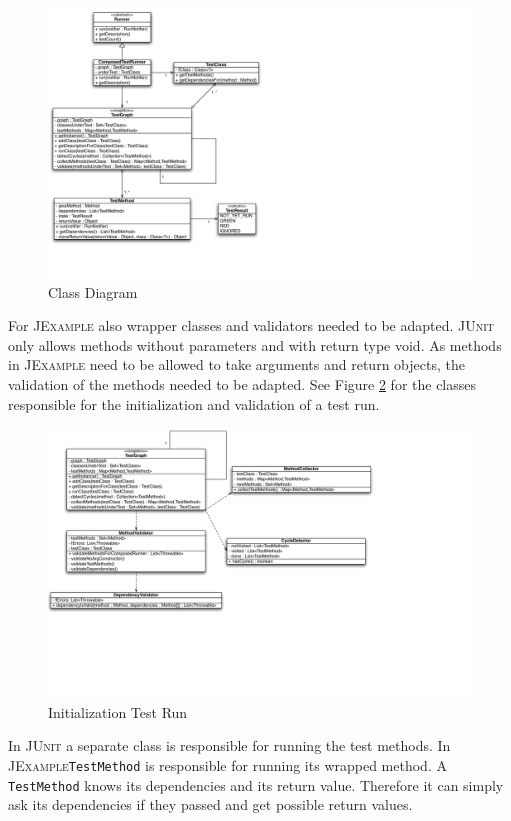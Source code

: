 \documentclass[11pt]{article}
\newcommand{\JUnit}{\textsc{JUnit}\xspace}
\newcommand{\JExample}{\textsc{JExample}\xspace}
\begin{document}
\begin{figure}[htbp]
 \includegraphics[width=24.0cm]{classdiagram.pdf}
 \caption{Class Diagram}
 \label{fig:classDiag}
\end{figure}

For \JExample also wrapper classes and validators needed to be adapted. \JUnit only allows methods without parameters and with return type void. As methods in \JExample need to be allowed to take arguments and return objects, the validation of the methods needed to be adapted. See Figure \ref{fig:classDiagInit} for the classes responsible for the initialization and validation of a test run.

\begin{figure}[htbp]
 \includegraphics[width=20.0cm]{classdiagramInit.pdf}
 \caption{Initialization Test Run}
 \label{fig:classDiagInit}
\end{figure}

In \JUnit a separate class is responsible for running the test methods. In \JExample \verb|TestMethod| is responsible for running its wrapped method. A \verb|TestMethod| knows its dependencies and its return value. Therefore it can simply ask its dependencies if they passed and get possible return values.
\end{document}
